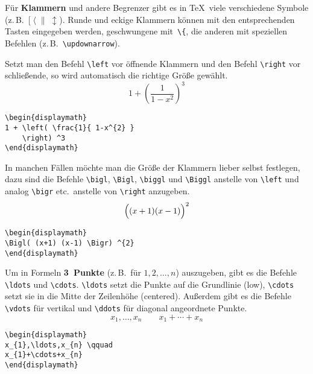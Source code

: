 Für \textbf{Klammern} und andere Begrenzer gibt es in \TeX\ 
viele verschiedene Symbole
(z.\,B.~\([\;\langle\;\|\;\updownarrow\)).
Runde und eckige Klammern können mit den entsprechenden Tasten
eingegeben werden, geschwungene mit~\lstinline|\{|, die anderen mit
speziellen Befehlen (z.\,B.~\lstinline|\updownarrow|).
 
Setzt man den Befehl \lstinline|\left| vor öffnende Klammern und den
Befehl \lstinline|\right| vor schließende, so wird automatisch die
richtige Größe gewählt.
\exa
\begin{displaymath}
1 + \left( \frac{1}{ 1-x^{2} }
    \right) ^3
\end{displaymath}
\exb
\begin{verbatim}
\begin{displaymath}
1 + \left( \frac{1}{ 1-x^{2} }
    \right) ^3
\end{displaymath}
\end{verbatim}
\exc
 
In manchen Fällen möchte man die Größe der Klammern lieber
selbst festlegen, dazu sind die Befehle
\lstinline|\bigl|,
\lstinline|\Bigl|,
\lstinline|\biggl| und
\lstinline|\Biggl| anstelle von \lstinline|\left|
und analog \lstinline|\bigr| etc.\ anstelle von \lstinline|\right|
anzugeben.
\exa
\begin{displaymath}
\Bigl( (x+1) (x-1) \Bigr) ^{2}
\end{displaymath}
\exb
\begin{verbatim}
\begin{displaymath}
\Bigl( (x+1) (x-1) \Bigr) ^{2}
\end{displaymath}
\end{verbatim}
\exc
 
Um in Formeln \textbf{3~Punkte} (z.\,B.\ für \(1,2,\ldots,n\))
auszugeben, gibt es die Befehle
\lstinline|\ldots| und \lstinline|\cdots|.
\lstinline|\ldots| setzt die Punkte auf die Grundlinie (low),
\lstinline|\cdots| setzt sie in die Mitte der Zeilenhöhe
(centered).
Außerdem gibt es die Befehle
\lstinline|\vdots| für vertikal und
\lstinline|\ddots| für diagonal angeordnete Punkte.
\exa
\begin{displaymath}
x_{1},\ldots,x_{n} \qquad
x_{1}+\cdots+x_{n}
\end{displaymath}
\exb
\begin{verbatim}
\begin{displaymath}
x_{1},\ldots,x_{n} \qquad
x_{1}+\cdots+x_{n}
\end{displaymath}
\end{verbatim}
\exc


